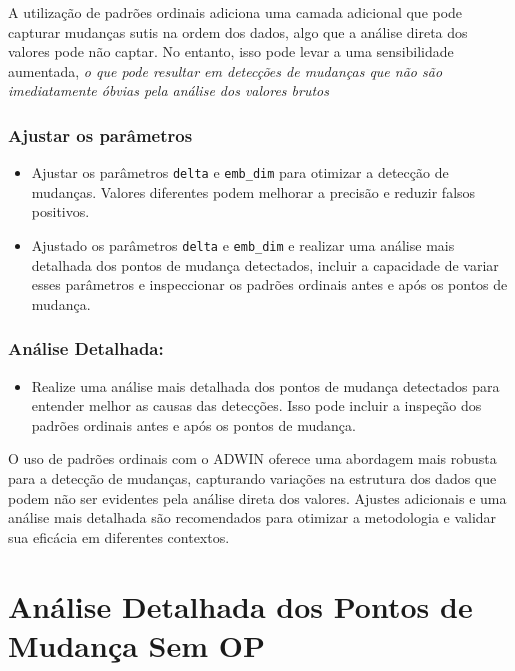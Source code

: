 \documentclass[
]{article}
\providecommand{\tightlist}{%
  \setlength{\itemsep}{0pt}\setlength{\parskip}{0pt}}
\begin{document}
A utilização de padrões ordinais adiciona uma camada adicional que pode
capturar mudanças sutis na ordem dos dados, algo que a análise direta
dos valores pode não captar. No entanto, isso pode levar a uma
sensibilidade aumentada, \emph{o que pode resultar em detecções de
mudanças que não são imediatamente óbvias pela análise dos valores
brutos}

\hypertarget{ajustar-os-paruxe2metros}{%
\subsubsection{Ajustar os parâmetros}\label{ajustar-os-paruxe2metros}}

\begin{itemize}
\item
  Ajustar os parâmetros \texttt{delta} e \texttt{emb\_dim} para otimizar
  a detecção de mudanças. Valores diferentes podem melhorar a precisão e
  reduzir falsos positivos.
\item
  Ajustado os parâmetros \texttt{delta} e \texttt{emb\_dim} e realizar
  uma análise mais detalhada dos pontos de mudança detectados, incluir a
  capacidade de variar esses parâmetros e inspeccionar os padrões
  ordinais antes e após os pontos de mudança.
\end{itemize}

\hypertarget{anuxe1lise-detalhada}{%
\subsubsection{Análise Detalhada:}\label{anuxe1lise-detalhada}}

\begin{itemize}
\tightlist
\item
  Realize uma análise mais detalhada dos pontos de mudança detectados
  para entender melhor as causas das detecções. Isso pode incluir a
  inspeção dos padrões ordinais antes e após os pontos de mudança.
\end{itemize}

O uso de padrões ordinais com o ADWIN oferece uma abordagem mais robusta
para a detecção de mudanças, capturando variações na estrutura dos dados
que podem não ser evidentes pela análise direta dos valores. Ajustes
adicionais e uma análise mais detalhada são recomendados para otimizar a
metodologia e validar sua eficácia em diferentes contextos.

\hypertarget{anuxe1lise-detalhada-dos-pontos-de-mudanuxe7a-sem-op}{%
\section{Análise Detalhada dos Pontos de Mudança Sem
OP}\label{anuxe1lise-detalhada-dos-pontos-de-mudanuxe7a-sem-op}}
\end{document}
